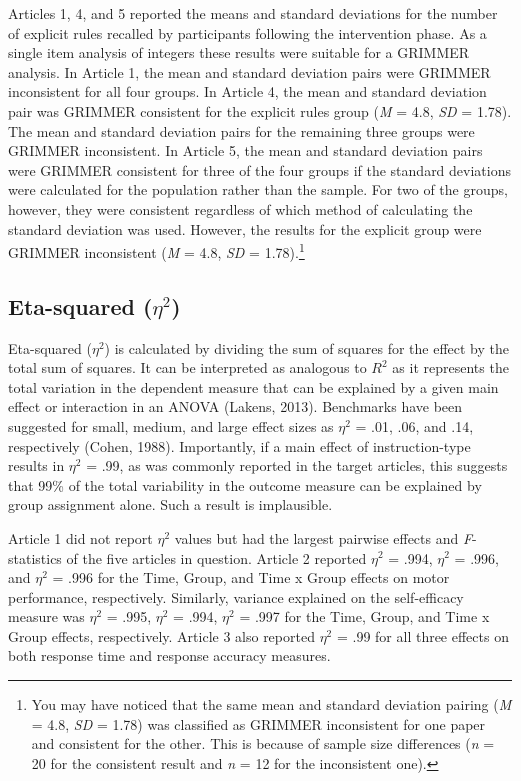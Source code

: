 \documentclass[
  english,
  man, donotrepeattitle,floatsintext]{apa7}
\begin{document}
Articles 1, 4, and 5 reported the means and standard deviations for the number of explicit rules recalled by participants following the intervention phase. As a single item analysis of integers these results were suitable for a GRIMMER analysis. In Article 1, the mean and standard deviation pairs were GRIMMER inconsistent for all four groups. In Article 4, the mean and standard deviation pair was GRIMMER consistent for the explicit rules group (\emph{M} = 4.8, \emph{SD} = 1.78). The mean and standard deviation pairs for the remaining three groups were GRIMMER inconsistent. In Article 5, the mean and standard deviation pairs were GRIMMER consistent for three of the four groups if the standard deviations were calculated for the population rather than the sample. For two of the groups, however, they were consistent regardless of which method of calculating the standard deviation was used. However, the results for the explicit group were GRIMMER inconsistent (\emph{M} = 4.8, \emph{SD} = 1.78).\footnote{You may have noticed that the same mean and standard deviation pairing (\emph{M} = 4.8, \emph{SD} = 1.78) was classified as GRIMMER inconsistent for one paper and consistent for the other. This is because of sample size differences (\emph{n} = 20 for the consistent result and \emph{n} = 12 for the inconsistent one).}

\hypertarget{eta-squared-eta2-1}{%
\subsection{\texorpdfstring{Eta-squared (\(\eta^{2}\))}{Eta-squared (\textbackslash eta\^{}\{2\})}}\label{eta-squared-eta2-1}}

Eta-squared (\(\eta^{2}\)) is calculated by dividing the sum of squares for the effect by the total sum of squares. It can be interpreted as analogous to \(R^{2}\) as it represents the total variation in the dependent measure that can be explained by a given main effect or interaction in an ANOVA (Lakens, 2013). Benchmarks have been suggested for small, medium, and large effect sizes as \(\eta^{2}\) = .01, .06, and .14, respectively (Cohen, 1988). Importantly, if a main effect of instruction-type results in \(\eta^{2}\) = .99, as was commonly reported in the target articles, this suggests that 99\% of the total variability in the outcome measure can be explained by group assignment alone. Such a result is implausible.

Article 1 did not report \(\eta^{2}\) values but had the largest pairwise effects and \emph{F}-statistics of the five articles in question. Article 2 reported \(\eta^{2}\) = .994, \(\eta^{2}\) = .996, and \(\eta^{2}\) = .996 for the Time, Group, and Time x Group effects on motor performance, respectively. Similarly, variance explained on the self-efficacy measure was \(\eta^{2}\) = .995, \(\eta^{2}\) = .994, \(\eta^{2}\) = .997 for the Time, Group, and Time x Group effects, respectively. Article 3 also reported \(\eta^{2}\) = .99 for all three effects on both response time and response accuracy measures.
\end{document}

